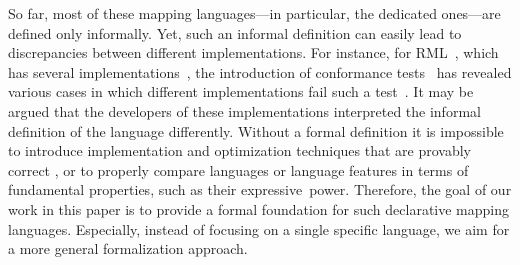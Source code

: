 So far,
	most
of these mapping languages---in particular, the dedicated ones---are defined only informally. Yet, such an informal definition can easily lead to discrepancies between different
	implementations.
For instance, for
RML~\cite{dimou_ldow_2014,Dimou2024:RMLSpec}, which has
several implementations~\cite{ArenasGuerrero2022MorphKGCScalable,Freund2024FlexRML,Iglesias2022ScalingKnowledgeGraph,MinOo2022RMLStreamer,Scrocca2020Transport}, the introduction of
conformance tests~\cite{Heyvaert2019:RMLTests} has revealed various cases in which
	different implementations fail
such a test~\cite{Heyvaert2022:RMLTestReports}. It may be argued that the developers of these implementations
	interpreted the informal definition of the language differently.
Without a formal definition it is impossible to introduce implementation and optimization techniques that are provably correct%
	, or
to
	properly compare languages or language features in terms of fundamental properties, such as their expressive~power.
%
%
Therefore, the goal of our work in this paper is to provide a
formal foundation for such declarative mapping languages. Especially, instead of focusing on a single specific language, we aim for a more general formalization approach.

